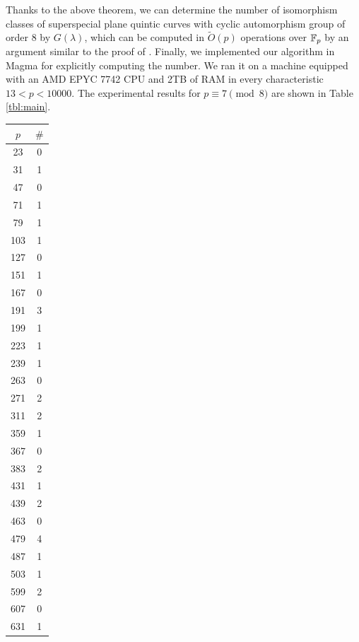 \documentclass{article}
\theoremstyle{definition}
\begin{document}
Thanks to the above theorem, we can determine the number of isomorphism classes of superspecial plane quintic curves with cyclic automorphism group of order $8$ by $G(\lambda)$, which can be computed in $\widetilde{O}(p)$ operations over $\mathbb{F}_p\hspace{-0.1mm}$ by an argument similar to the proof of \cite[Theorem 3.2.9]{OK}.
Finally, we implemented our algorithm in Magma for explicitly computing the number.
We ran it on a machine equipped with an AMD EPYC 7742 CPU and 2TB of RAM in every characteristic $13 < p < 10000$.
The experimental results for $p \equiv 7 \pmod{8}$ are shown in Table \ref{tbl:main}.

\begin{table}[htbp]
\centering
\begin{minipage}{0.135\textwidth}
    \centering
    \begin{tabular}{c|c}
        $p$ & $\#$ \\ \hline
        23 & 0 \\
        31 & 1 \\
        47 & 0 \\
        71 & 1 \\
        79 & 1 \\
        103 & 1 \\
        127 & 0 \\
        151 & 1 \\
        167 & 0 \\
        191 & 3 \\
        199 & 1 \\
        223 & 1 \\
        239 & 1 \\
        263 & 0 \\
        271 & 2 \\
        311 & 2 \\
        359 & 1 \\
        367 & 0 \\
        383 & 2 \\
        431 & 1 \\
        439 & 2 \\
        463 & 0 \\
        479 & 4 \\
        487 & 1 \\
        503 & 1 \\
        599 & 2 \\
        607 & 0 \\
        631 & 1 \\

\end{tabular}
\end{minipage}
\end{table}
\end{document}
